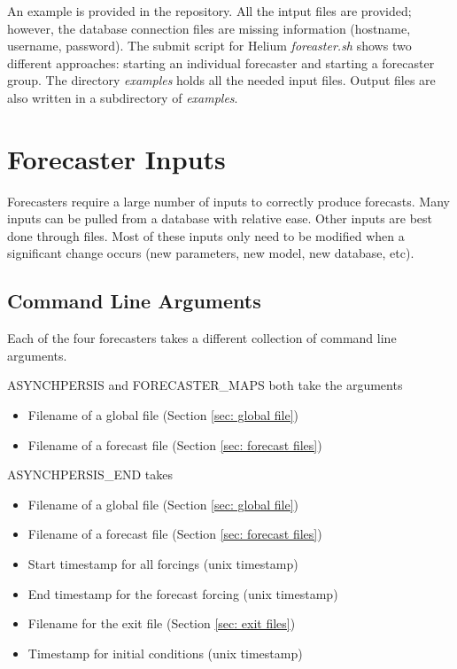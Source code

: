 \documentclass[12pt]{article}
\begin{document}
An example is provided in the repository. All the intput files are provided; however, the database connection files are missing information (hostname, username, password). The submit script for Helium \emph{foreaster.sh} shows two different approaches: starting an individual forecaster and starting a forecaster group. The directory \emph{examples} holds all the needed input files. Output files are also written in a subdirectory of \emph{examples}.


\section{Forecaster Inputs} \label{sec: forecaster inputs}

Forecasters require a large number of inputs to correctly produce forecasts. Many inputs can be pulled from a database with relative ease. Other inputs are best done through files. Most of these inputs only need to be modified when a significant change occurs (new parameters, new model, new database, etc).

\subsection{Command Line Arguments} \label{sec: command line arguments}

Each of the four forecasters takes a different collection of command line arguments.

ASYNCHPERSIS and FORECASTER\_MAPS both take the arguments
\begin{itemize}
 \item Filename of a global file (Section \ref{sec: global file})
 \item Filename of a forecast file (Section \ref{sec: forecast files})
\end{itemize}
 
ASYNCHPERSIS\_END takes
\begin{itemize}
 \item Filename of a global file (Section \ref{sec: global file})
 \item Filename of a forecast file (Section \ref{sec: forecast files})
 \item Start timestamp for all forcings (unix timestamp)
 \item End timestamp for the forecast forcing (unix timestamp)
 \item Filename for the exit file (Section \ref{sec: exit files})
 \item Timestamp for initial conditions (unix timestamp)
\end{itemize}
\end{document}
